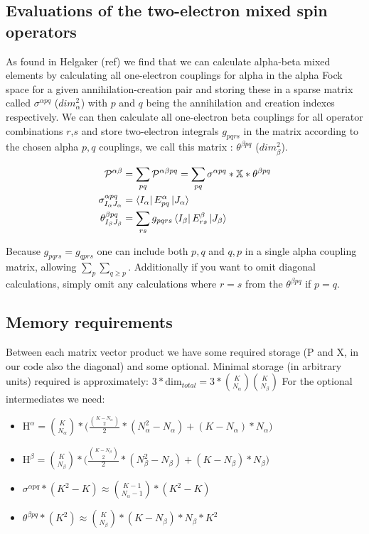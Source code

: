 \subsection{Evaluations of the two-electron mixed spin operators}

As found in Helgaker (ref) we find that we can calculate alpha-beta mixed elements by calculating all one-electron couplings for alpha in the alpha Fock space for a given annihilation-creation pair and storing these in a sparse matrix called $\sigma^{\alpha pq}$ ($dim^{2}_{\alpha}$) with $p$ and $q$ being the annihilation and creation indexes respectively.
We can then calculate all one-electron beta couplings for all operator combinations $r$,$s$ and store two-electron integrals $g_{pqrs}$ in the matrix according to the chosen alpha $p,q$ couplings, we call this matrix : $\theta^{\beta pq}$ ($dim^{2}_{\beta}$).

\begin{align}
\mathcal{P}^{\alpha \beta} & = \sum_{pq}  \mathcal{P}^{\alpha \beta pq} = \sum_{pq} \sigma^{\alpha pq} * \mathbb{X} * \theta^{\beta pq} \\
\sigma^{\alpha pq}_{I_\alpha J_\alpha} & =\bra{I_\alpha} E^{\alpha}_{pq} \ket{J_\alpha} \\
\theta^{\beta pq}_{I_\beta J_\beta} &  = \sum_{rs} g_{pqrs} \bra{I_\beta} E^{\beta}_{rs} \ket{J_\beta}
\end{align}

Because $g_{pqrs} = g_{qprs}$ one can include both $p,q$ and $q,p$ in a single alpha coupling matrix, allowing $\sum_p \sum_{q \geq p}$. Additionally if you want to omit diagonal calculations, simply omit any calculations where $r=s$ from the $\theta^{\beta pq}$ if $p=q$.

\subsection{Memory requirements}

Between each matrix vector product we have some required storage (P and X, in our code also the diagonal) and some optional.
Minimal storage (in arbitrary units) required is approximately: $3 * \text{dim}_{total} = 3 * \binom{K}{N_\alpha}\binom{K}{N_\beta}$
For the optional intermediates we need:
\begin{itemize}
  \item $\text{H}^{\alpha} = \binom{K}{N_\alpha} * \big(\frac{\binom{K-N_\alpha}{2}}{2} * (N_{\alpha}^2-N_\alpha) + (K-N_\alpha)*N_\alpha \big)$

    \item $\text{H}^{\beta} = \binom{K}{N_\beta} * \big(\frac{\binom{K-N_\beta}{2}}{2} * (N_{\beta}^2-N_\beta) + (K-N_\beta)*N_\beta \big)$
  \item  $\sigma^{\alpha pq} * (K^2 - K) \approx \binom{K-1}{N_\alpha-1} * (K^2 - K) $
  \item $\theta^{\beta pq} * (K^2) \approx \binom{K}{N_\beta} * (K-N_\beta)*N_\beta * K^2$
\end{itemize}

